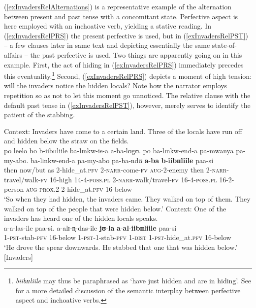 (\ref{exInvadersRelAlternations}) is a representative example of the alternation between present and past tense with a concomitant state. Perfective aspect is here employed with an inchoative verb, yielding a stative reading. In (\ref{exInvadersRelPRS}) the present perfective is used, but in (\ref{exInvadersRelPST}) -- a few clauses later in same text and depicting essentially the same state-of-affairs -- the past perfective is used. Two things are apparently going on in this example. First, the act of hiding in (\ref{exInvadersRelPRS}) immediately precedes this eventuality.\footnote{\textit{biibɪɪliile} may thus be paraphrased as \lq have just hidden and are in hiding'. See  for a more detailed discussion of the semantic interplay between perfective aspect and inchoative verbs.} Second, (\ref{exInvadersRelPRS}) depicts a moment of high tension: will the invaders notice the hidden locals? Note how the narrator employs repetition so as not to let this moment go unnoticed. The relative clause with the default past tense in (\ref{exInvadersRelPST}), however, merely serves to identify the patient of the stabbing.

\begin{exe}
\ex \label{exInvadersRelAlternations}\begin{xlist}
\ex Context: Invaders have come to a certain land. Three of the locals have run off and hidden below the straw on the fields.\label{exInvadersRelPRS}\\
\gll po leelo bo b-iibɪɪliile ba-lɪnkw-is-a a-ba-lʊgʊ. po ba-lɪnkw-end-a pa-mwanya pa-my-abo. ba-lɪnkw-end-a pa-my-abo pa-ba-ndʊ \textbf{a}-\textbf{ba} \textbf{b}-\textbf{iibɪɪliile} paa-si\\ %
then now/but as 2-hide\_at.\textsc{pfv} 2-\textsc{narr}-come-\textsc{fv} \textsc{aug}-2-enemy then 2-\textsc{narr}-travel/walk-\textsc{fv} 16-high 14-4-\textsc{poss.pl} 2-\textsc{narr}-walk/travel-\textsc{fv} 16-4-\textsc{poss.pl} 16-2-person \textsc{aug}-\textsc{prox.2} 2-hide\_at.\textsc{pfv} 16-below\\
\glt \lq ‎‎So when they had hidden, the invaders came. They walked on top of them. They walked on top of the people that were hidden below.'
\ex Context: One of the invaders has heard one of the hidden locals speaks.\\
\label{exInvadersRelPST} \gll a-a-las-ile paa-si. a-alɪ-n̩-das-ile \textbf{jʊ}-\textbf{la} \textbf{a}-\textbf{al}-\textbf{iibɪɪliile} paa-si\\
1-\textsc{pst}-stab-\textsc{pfv} 16-below 1-\textsc{pst}-1-stab-\textsc{pfv} 1-\textsc{dist} 1-\textsc{pst}-hide\_at.\textsc{pfv} 16-below\\
\glt \lq He drove the spear downwards. He stabbed that one that was hidden below.' [Invaders]
\end{xlist}
\end{exe}

